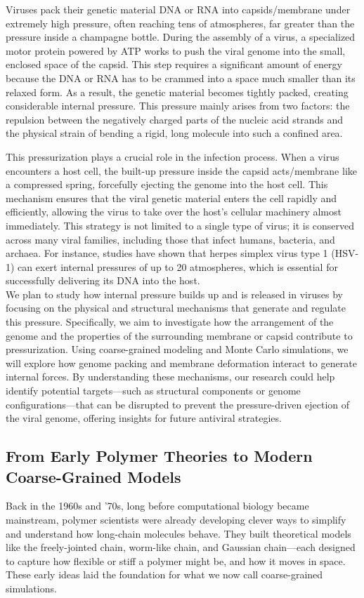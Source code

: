 \documentclass[12pt]{article}
\begin{document}
\begin{flushleft}
Viruses pack their genetic material DNA or RNA into capsids/membrane under extremely high pressure, often reaching tens of atmospheres, far greater than the pressure inside a champagne bottle. During the assembly of a virus, a specialized motor protein powered by ATP works to push the viral genome into the small, enclosed space of the capsid. This step requires a significant amount of energy because the DNA or RNA has to be crammed into a space much smaller than its relaxed form. As a result, the genetic material becomes tightly packed, creating considerable internal pressure. This pressure mainly arises from two factors: the repulsion between the negatively charged parts of the nucleic acid strands and the physical strain of bending a rigid, long molecule into such a confined area.\cite{BrandarizNunez2019}




This pressurization plays a crucial role in the infection process. When a virus encounters a host cell, the built-up pressure inside the capsid acts/membrane like a compressed spring, forcefully ejecting the genome into the host cell. This mechanism ensures that the viral genetic material enters the cell rapidly and efficiently, allowing the virus to take over the host’s cellular machinery almost immediately. This strategy is not limited to a single type of virus; it is conserved across many viral families, including those that infect humans, bacteria, and archaea. For instance, studies have shown that herpes simplex virus type 1 (HSV-1) can exert internal pressures of up to 20 atmospheres, which is essential for successfully delivering its DNA into the host\cite{BrandarizNunez2019}.\\

We plan to study how internal pressure builds up and is released in viruses by focusing on the physical and structural mechanisms that generate and regulate this pressure. Specifically, we aim to investigate how the arrangement of the genome and the properties of the surrounding membrane or capsid contribute to pressurization. Using coarse-grained modeling and Monte Carlo simulations, we will explore how genome packing and membrane deformation interact to generate internal forces. By understanding these mechanisms, our research could help identify potential targets—such as structural components or genome configurations—that can be disrupted to prevent the pressure-driven ejection of the viral genome, offering insights for future antiviral strategies.


\subsection*{From Early Polymer Theories to Modern Coarse-Grained Models}
Back in the 1960s and '70s, long before computational biology became mainstream, polymer scientists were already developing clever ways to simplify and understand how long-chain molecules behave. They built theoretical models like the freely-jointed chain, worm-like chain, and Gaussian chain—each designed to capture how flexible or stiff a polymer might be, and how it moves in space. These early ideas laid the foundation for what we now call coarse-grained simulations.


\end{flushleft}
\end{document}
